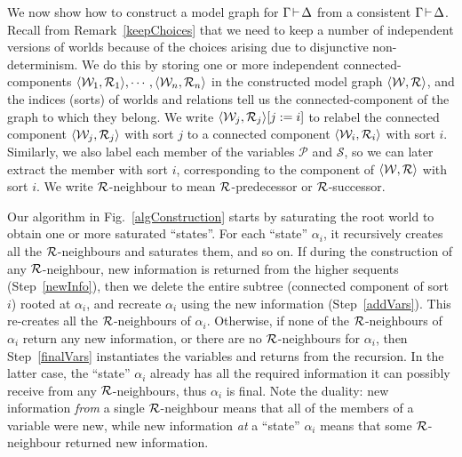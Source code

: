 \documentclass{llncs}
\numberwithin{equation}{section}
\newcommand{\pair}[2]{\langle #1, #2\rangle}
\newcommand{\Pred}{{\mathcal{P}}}
\newcommand{\Succ}{{\mathcal{S}}}
\newcommand{\sequent}{\vdash}
\newcommand{\mycal}[1]{
        {\cal{#1}}
}
\begin{document}
We now show how to construct a model graph for
$\Gamma\hspace{-0.05cm}\sequent\hspace{-0.05cm}\Delta$ from a
consistent $\Gamma\hspace{-0.05cm}\sequent\hspace{-0.05cm}\Delta$.
Recall from Remark~\ref{keepChoices} that we need to keep a number of
independent versions of worlds because of the choices arising due to
disjunctive non-determinism. We do this by storing one or more
independent connected-components $\pair{\mycal{W}_1}{\mycal{R}_1},
\cdots, \pair{\mycal{W}_n}{\mycal{R}_n}$ in the constructed model
graph $\pair{\mycal{W}}{\mycal{R}}$, and the indices (sorts) of worlds
and relations tell us the connected-component of the graph to which
they belong.
We write $\pair{\mycal{W}_j}{\mycal{R}_j}[j:=i]$ to relabel the
connected component $\pair{\mycal{W}_j}{\mycal{R}_j}$ with sort $j$ to
a connected component $\pair{\mycal{W}_i}{\mycal{R}_i}$ with sort $i$.
Similarly, we also label each member of the variables $\Pred$ and
$\Succ$, so we can later extract the member 
with sort $i$, corresponding to the component
of $\pair{\mycal{W}}{\mycal{R}}$ with sort $i$. We write
$\mycal{R}$-neighbour to mean $\mycal{R}$-predecessor or
$\mycal{R}$-successor.

Our algorithm in Fig.~\ref{algConstruction} starts by saturating the
root world to obtain one or more saturated ``states''. For each
``state'' $\alpha_i$, it recursively creates all the
$\mycal{R}$-neighbours and saturates them, and so on.  If during the
construction of any $\mycal{R}$-neighbour, new information is returned
from the higher sequents (Step~\ref{newInfo}), then we delete the
entire subtree (connected component of sort $i$) rooted at $\alpha_i$,
and recreate $\alpha_i$ using the new information
(Step~\ref{addVars}). This re-creates all the
$\mycal{R}$-neighbours of $\alpha_i$. Otherwise, if none of the
$\mycal{R}$-neighbours of $\alpha_i$ return any new information, or
there are no $\mycal{R}$-neighbours for $\alpha_i$, then
Step~\ref{finalVars} instantiates the variables and returns from the
recursion. In the latter case, the ``state'' $\alpha_i$ already has
all the required information it can possibly receive from any
$\mycal{R}$-neighbours, thus $\alpha_i$ is final. Note the duality:
new information {\em from} a single $\mycal{R}$-neighbour means that
all of the members of a variable were new, while new information {\em
  at} a ``state'' $\alpha_i$ means that some $\mycal{R}$-neighbour
returned new information.
\end{document}
